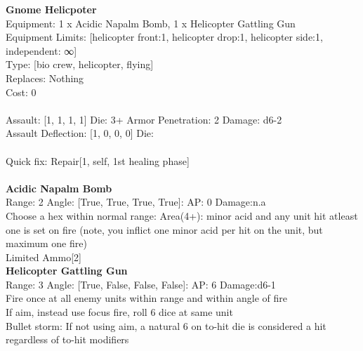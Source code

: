 {\bf Gnome Helicpoter } \\
Equipment: 1 x Acidic Napalm Bomb, 1 x Helicopter Gattling Gun \\
Equipment Limits: [helicopter front:1, helicopter drop:1, helicopter side:1, independent: ∞] \\
Type: [bio crew, helicopter, flying] \\
Replaces: Nothing \\
Cost: 0\\
\ \\
Assault: [1, 1, 1, 1] Die: 3+ Armor Penetration: 2 Damage: d6-2 \\
Assault Deflection: [1, 0, 0, 0] Die: \\
\indent  
\ \\
Quick fix: Repair[1, self, 1st healing phase]\\ 

\ \\
{\bf Acidic Napalm Bomb } \\



Range: 2  Angle: [True, True, True, True]: AP: 0 Damage:n.a \\
Choose a hex within normal range: Area(4+): minor acid and any unit hit atleast one is set on fire (note, you inflict one minor acid per hit on the unit, but maximum one fire)\\ 
Limited Ammo[2]\\ 




{\bf Helicopter Gattling Gun } \\



Range: 3  Angle: [True, False, False, False]: AP: 6 Damage:d6-1 \\
Fire once at all enemy units within range and within angle of fire\\ 
If aim, instead use focus fire, roll 6 dice at same unit\\ 
Bullet storm: If not using aim, a natural 6 on to-hit die is considered a hit regardless of to-hit modifiers\\ 




 
\ \\



